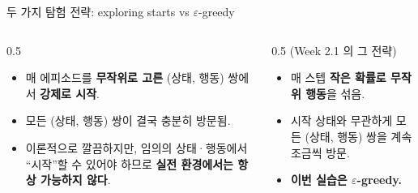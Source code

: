 \begin{frame}{두 가지 탐험 전략: exploring starts vs
$\varepsilon$-greedy}
  \begin{columns}[T]
    \begin{column}{0.5\textwidth}
      \begin{itemize}
        \item 매 에피소드를 \textbf{무작위로 고른} (상태,
          행동) 쌍에서 \textbf{강제로 시작}.
        \item 모든 (상태, 행동) 쌍이 결국 충분히 방문됨.
        \item 이론적으로 깔끔하지만, 임의의 상태·행동에서
          ``시작''할 수 있어야 하므로 \textbf{실전 환경에서는
          항상 가능하지 않다}.
      \end{itemize}
    \end{column}
    \begin{column}{0.5\textwidth}
       (Week 2.1 의 그 전략)
      \begin{itemize}
        \item 매 스텝 \textbf{작은 확률로 무작위 행동}을 섞음.
        \item 시작 상태와 무관하게 모든 (상태, 행동) 쌍을
          계속 조금씩 방문.
        \item \textbf{이번 실습은 $\varepsilon$-greedy.}
      \end{itemize}
    \end{column}
  \end{columns}
\end{frame}
